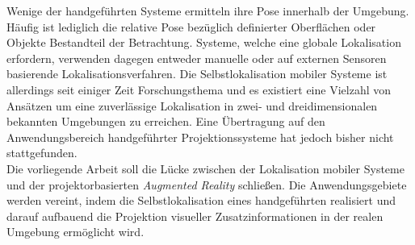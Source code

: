 Wenige der handgeführten Systeme ermitteln ihre Pose innerhalb der Umgebung. Häufig ist lediglich die relative Pose bezüglich definierter Oberflächen oder Objekte Bestandteil der Betrachtung. Systeme, welche eine globale Lokalisation erfordern, verwenden dagegen entweder manuelle oder auf externen Sensoren basierende Lokalisationsverfahren. Die Selbstlokalisation mobiler Systeme ist allerdings seit einiger Zeit Forschungsthema und es existiert eine Vielzahl von Ansätzen um eine zuverlässige Lokalisation in zwei- und dreidimensionalen bekannten Umgebungen zu erreichen. Eine Übertragung auf den Anwendungsbereich handgeführter Projektionssysteme hat jedoch bisher nicht stattgefunden.\\
Die vorliegende Arbeit soll die Lücke zwischen der Lokalisation mobiler Systeme und der projektorbasierten \textit{Augmented Reality} schließen. Die Anwendungsgebiete werden vereint, indem die Selbstlokalisation eines handgeführten  realisiert und darauf aufbauend die Projektion visueller Zusatzinformationen in der realen Umgebung ermöglicht wird.

\\

\\

